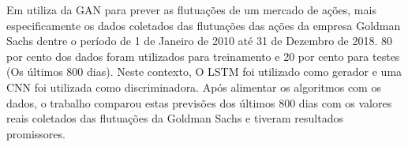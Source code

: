 Em \cite{banushev_2019} utiliza da \acrshort{GAN} para prever as flutuações de um mercado de ações, mais especificamente os dados coletados das flutuações das ações da empresa Goldman Sachs dentre o período de 1 de Janeiro de 2010 até 31 de Dezembro de 2018. 80 por cento dos dados foram utilizados para treinamento e 20 por cento para testes (Os últimos 800 dias). Neste contexto, O LSTM foi utilizado como gerador e uma CNN foi utilizada como discriminadora. Após alimentar os algoritmos com os dados, o trabalho comparou estas previsões dos últimos 800 dias com os valores reais coletados das flutuações da Goldman Sachs e tiveram resultados promissores.












